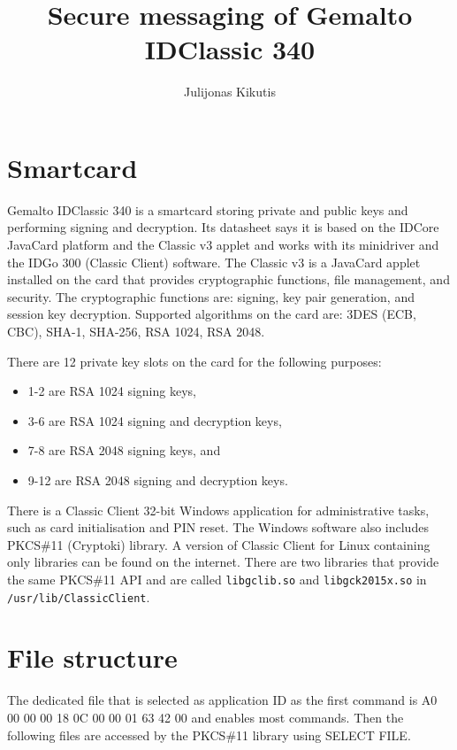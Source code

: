 \documentclass[a4paper]{article}
\title{Secure messaging of Gemalto IDClassic 340}
\author{Julijonas Kikutis}
\begin{document}
	
\maketitle


\section{Smartcard}

Gemalto IDClassic 340 is a smartcard storing private and public keys and performing signing and decryption. Its datasheet \cite{datasheet} says it is based on the IDCore JavaCard platform and the Classic v3 applet and works with its minidriver and the IDGo 300 (Classic Client) software. The Classic v3 is a JavaCard applet installed on the card that provides cryptographic functions, file management, and security. The cryptographic functions are: signing, key pair generation, and session key decryption. Supported algorithms on the card are: 3DES (ECB, CBC), SHA-1, SHA-256, RSA 1024, RSA 2048.

There are 12 private key slots on the card for the following purposes:
\begin{itemize}
	\item 1-2 are RSA 1024 signing keys,
	\item 3-6 are RSA 1024 signing and decryption keys,
	\item 7-8 are RSA 2048 signing keys, and
	\item 9-12 are RSA 2048 signing and decryption keys.
\end{itemize}

There is a Classic Client 32-bit Windows application for administrative tasks, such as card initialisation and PIN reset. The Windows software also includes PKCS\#11 (Cryptoki) library. A version of Classic Client for Linux containing only libraries can be found on the internet. There are two libraries that provide the same PKCS\#11 API and are called \texttt{libgclib.so} and \texttt{libgck2015x.so} in \texttt{/usr/lib/ClassicClient}.


\section{File structure}

The dedicated file that is selected as application ID as the first command is A0 00 00 00 18 0C 00 00 01 63 42 00 and enables most commands. Then the following files are accessed by the PKCS\#11 library using SELECT FILE.
\end{document}
